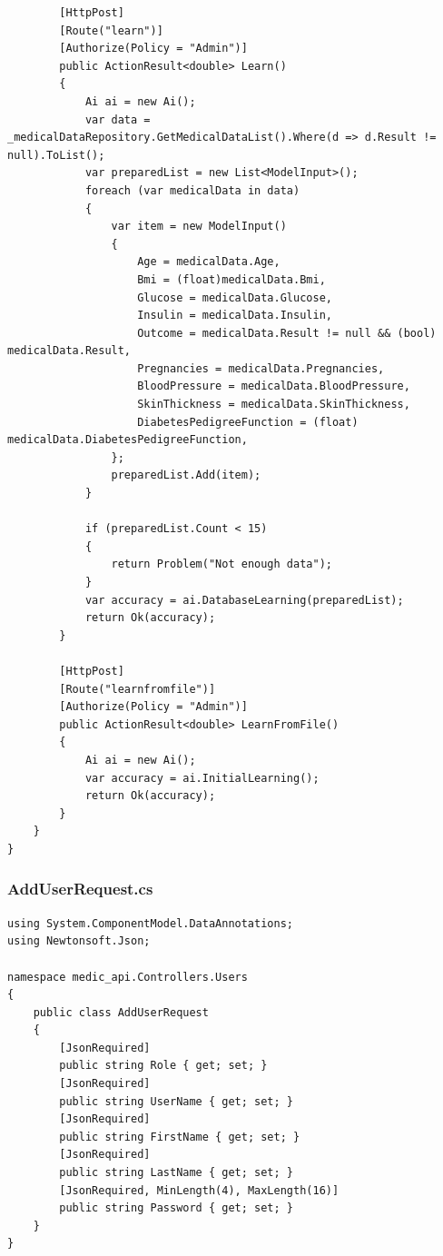 \documentclass[12pt,a4paper]{article}
\begin{document}
\begin{lstlisting}
        [HttpPost]
        [Route("learn")]
        [Authorize(Policy = "Admin")]
        public ActionResult<double> Learn()
        {
            Ai ai = new Ai();
            var data = _medicalDataRepository.GetMedicalDataList().Where(d => d.Result != null).ToList();
            var preparedList = new List<ModelInput>();
            foreach (var medicalData in data)
            {
                var item = new ModelInput()
                {
                    Age = medicalData.Age,
                    Bmi = (float)medicalData.Bmi,
                    Glucose = medicalData.Glucose,
                    Insulin = medicalData.Insulin,
                    Outcome = medicalData.Result != null && (bool) medicalData.Result,
                    Pregnancies = medicalData.Pregnancies,
                    BloodPressure = medicalData.BloodPressure,
                    SkinThickness = medicalData.SkinThickness,
                    DiabetesPedigreeFunction = (float) medicalData.DiabetesPedigreeFunction,
                };
                preparedList.Add(item);
            }

            if (preparedList.Count < 15)
            {
                return Problem("Not enough data");
            }
            var accuracy = ai.DatabaseLearning(preparedList);
            return Ok(accuracy);
        }

        [HttpPost]
        [Route("learnfromfile")]
        [Authorize(Policy = "Admin")]
        public ActionResult<double> LearnFromFile()
        {
            Ai ai = new Ai();
            var accuracy = ai.InitialLearning();
            return Ok(accuracy);
        }
    }
}
	\end{lstlisting}
	\subsubsection{AddUserRequest.cs}
	\begin{lstlisting}
using System.ComponentModel.DataAnnotations;
using Newtonsoft.Json;

namespace medic_api.Controllers.Users
{
    public class AddUserRequest
    {
        [JsonRequired]
        public string Role { get; set; }
        [JsonRequired]
        public string UserName { get; set; }
        [JsonRequired]
        public string FirstName { get; set; }
        [JsonRequired]
        public string LastName { get; set; }
        [JsonRequired, MinLength(4), MaxLength(16)]
        public string Password { get; set; }
    }
}
	\end{lstlisting}
\end{document}
